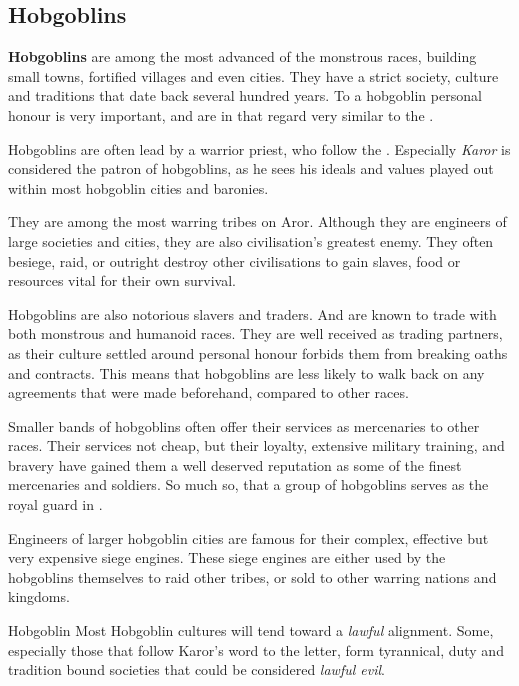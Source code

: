 \subsection{Hobgoblins}
\label{sec:Hobgoblins}

\textbf{Hobgoblins} are among the most advanced of the monstrous races,
building small towns, fortified villages and even cities. They have a strict
society, culture and traditions that date back several hundred years.
To a hobgoblin personal honour is very important, and are in that regard very
similar to the .

Hobgoblins are often lead by a warrior priest, who follow the
. Especially \emph{Karor} is considered the patron of
hobgoblins, as he sees his ideals and values played out within most hobgoblin
cities and baronies.

They are among the most warring tribes on Aror. Although they are engineers of
large societies and cities, they are also civilisation's greatest enemy. They
often besiege, raid, or outright destroy other civilisations to gain slaves,
food or resources vital for their own survival.

Hobgoblins are also notorious slavers and traders. And are known to trade
with both monstrous and humanoid races. They are well received as trading
partners, as their culture settled around personal honour forbids them from
breaking oaths and contracts. This means that hobgoblins are less likely to
walk back on any agreements that were made beforehand, compared to other races.

Smaller bands of hobgoblins often offer their services as mercenaries to other
races. Their services not cheap, but their loyalty, extensive military
training, and bravery have gained them a well deserved reputation as some of
the finest mercenaries and soldiers. So much so, that a group of hobgoblins
serves as the royal guard in .

Engineers of larger hobgoblin cities are famous for their complex, effective
but very expensive siege engines. These siege engines are either used by the
hobgoblins themselves to raid other tribes, or sold to other warring nations
and kingdoms.

\begin{35e}{Hobgoblin}
  Most Hobgoblin cultures will tend toward a \emph{lawful} alignment.
  Some, especially those that follow Karor's word to the letter, form
  tyrannical, duty and tradition bound societies that could be considered
  \emph{lawful evil}.
\end{35e}
